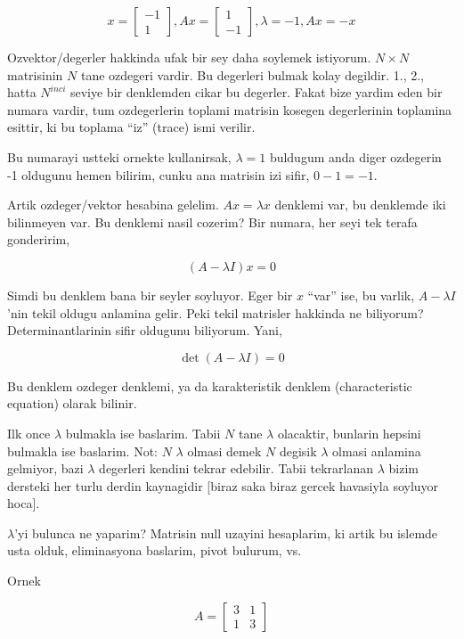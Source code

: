 \documentclass[12pt,fleqn]{article}\usepackage{../common}
\begin{document}
$$ 
x = \left[\begin{array}{r}
-1 \\ 1
\end{array}\right], 
Ax = \left[\begin{array}{r}
1 \\ -1
\end{array}\right], 
\lambda = -1, Ax = -x
 $$

Ozvektor/degerler hakkinda ufak bir sey daha soylemek istiyorum. $N \times
N$ matrisinin $N$ tane ozdegeri vardir. Bu degerleri bulmak kolay
degildir. 1., 2., hatta $N^{inci}$ seviye bir denklemden cikar bu
degerler. Fakat bize yardim eden bir numara vardir, tum ozdegerlerin
toplami matrisin kosegen degerlerinin toplamina esittir, ki bu toplama
``iz'' (trace) ismi verilir. 

Bu numarayi ustteki ornekte kullanirsak, $\lambda = 1$ buldugum anda diger
ozdegerin -1 oldugunu hemen bilirim, cunku ana matrisin izi sifir, 
$0 - 1 =
-1$. 

Artik ozdeger/vektor hesabina gelelim. $Ax = \lambda x$ denklemi var, bu
denklemde iki bilinmeyen var. Bu denklemi nasil cozerim? Bir numara, her
seyi tek terafa gonderirim,

$$ (A-\lambda I )x = 0 $$

Simdi bu denklem bana bir seyler soyluyor. Eger bir $x$ ``var'' ise, bu
varlik, $A-\lambda I$'nin tekil oldugu anlamina gelir. Peki tekil matrisler
hakkinda ne biliyorum? Determinantlarinin sifir oldugunu biliyorum. Yani,

$$ \det (A -\lambda I) = 0 $$

Bu denklem ozdeger denklemi, ya da karakteristik denklem (characteristic
equation) olarak bilinir. 

Ilk once $\lambda$ bulmakla ise baslarim. Tabii $N$ tane $\lambda$
olacaktir, bunlarin hepsini bulmakla ise baslarim. Not: $N$ $\lambda$
olmasi demek $N$ degisik $\lambda$ olmasi anlamina gelmiyor, bazi $\lambda$
degerleri kendini tekrar edebilir. Tabii tekrarlanan $\lambda$ bizim
dersteki her turlu derdin kaynagidir [biraz saka biraz gercek havasiyla
soyluyor hoca].

$\lambda$'yi bulunca ne yaparim? Matrisin null uzayini hesaplarim, ki artik
bu islemde usta olduk, eliminasyona baslarim, pivot bulurum, vs. 

Ornek

$$ 
A = \left[\begin{array}{ccc}
3 & 1 \\ 1 & 3
\end{array}\right]
 $$
\end{document}

